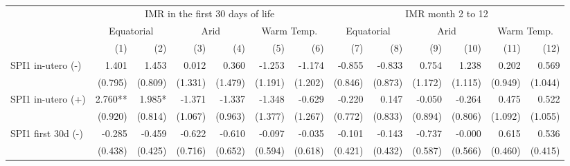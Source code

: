 \begin{table}[H]
\centering
\caption{}
\label{table3}
\begin{adjustbox}{max width=\linewidth}
\begin{tabular}{lrrrrrrrrrrrr}
    \toprule
                                                & \multicolumn{6}{c}{IMR in the first 30 days of life} & \multicolumn{6}{c}{IMR month 2 to 12} \\ 
    \cmidrule(lr){2-7} \cmidrule(lr){8-13} 
    & \multicolumn{2}{c}{Equatorial} & \multicolumn{2}{c}{Arid} & \multicolumn{2}{c}{Warm Temp.}  & \multicolumn{2}{c}{Equatorial} & \multicolumn{2}{c}{Arid} & \multicolumn{2}{c}{Warm Temp.} \\ 
    \cmidrule(lr){2-3} \cmidrule(lr){4-5} \cmidrule(lr){6-7} \cmidrule(lr){8-9} \cmidrule(lr){10-11} \cmidrule(lr){12-13} 
                                                &          (1) &         (2) &          (3) &          (4) &          (5)&         (6)  &         (7)&         (8)&         (9)  &         (10) &         (11) &         (12)  \\ 
    \midrule
    SPI1 in-utero  (-)                          &        1.401 &       1.453 &       0.012 &        0.360 &     -1.253   &      -1.174 &    -0.855 &      -0.833 &         0.754 &        1.238 &        0.202 &        0.569 \\ 
                                                &      (0.795) &     (0.809) &     (1.331) &      (1.479) &    (1.191)   &     (1.202) &   (0.846) &     (0.873) &       (1.172) &      (1.115) &      (0.949) &      (1.044) \\ 
    SPI1 in-utero  (+)                          &      2.760** &      1.985* &      -1.371 &       -1.337 &     -1.348   &      -0.629 &    -0.220 &       0.147 &        -0.050 &       -0.264 &        0.475 &        0.522 \\ 
                                                &      (0.920) &     (0.814) &     (1.067) &      (0.963) &    (1.377)   &     (1.267) &   (0.772) &     (0.833) &       (0.894) &      (0.806) &      (1.092) &      (1.055) \\ 
    SPI1 first 30d  (-)                         &       -0.285 &      -0.459 &      -0.622 &       -0.610 &     -0.097   &      -0.035 &    -0.101 &      -0.143 &        -0.737 &       -0.000 &        0.615 &        0.536 \\ 
                                                &      (0.438) &     (0.425) &     (0.716) &      (0.652) &    (0.594)   &     (0.618) &   (0.421) &     (0.432) &       (0.587) &      (0.566) &      (0.460) &      (0.415) \\ 

\end{tabular}
\end{adjustbox}
\end{table}
